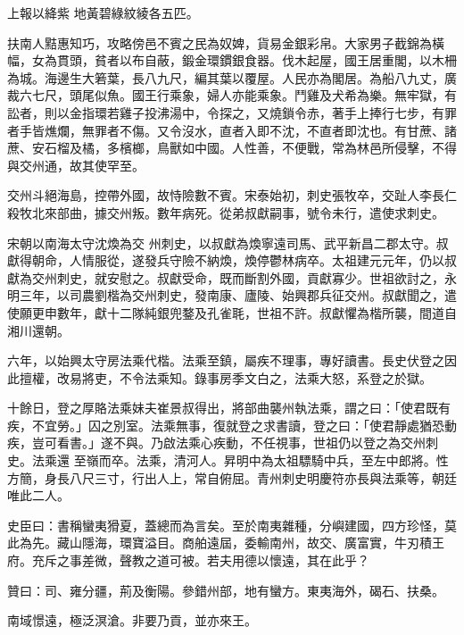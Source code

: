 \begin{pinyinscope}
 上報以絳紫
 地黃碧綠紋綾各五匹。



 扶南人黠惠知巧，攻略傍邑不賓之民為奴婢，貨易金銀彩帛。大家男子截錦為橫幅，女為貫頭，貧者以布自蔽，鍛金環鏆銀食器。伐木起屋，國王居重閣，以木柵為城。海邊生大箬葉，長八九尺，編其葉以覆屋。人民亦為閣居。為船八九丈，廣裁六七尺，頭尾似魚。國王行乘象，婦人亦能乘象。鬥雞及犬希為樂。無牢獄，有訟者，則以金指環若雞子投沸湯中，令探之，又燒鎖令赤，著手上捧行七步，有罪者手皆燋爛，無罪者不傷。又令沒水，直者入即不沈，不直者即沈也。有甘蔗、諸蔗、安石榴及橘，多檳榔，鳥獸如中國。人性善，不便戰，常為林邑所侵擊，不得與交州通，故其使罕至。



 交州斗絕海島，控帶外國，故恃險數不賓。宋泰始初，刺史張牧卒，交趾人李長仁殺牧北來部曲，據交州叛。數年病死。從弟叔獻嗣事，號令未行，遣使求刺史。



 宋朝以南海太守沈煥為交
 州刺史，以叔獻為煥寧遠司馬、武平新昌二郡太守。叔獻得朝命，人情服從，遂發兵守險不納煥，煥停鬱林病卒。太祖建元元年，仍以叔獻為交州刺史，就安慰之。叔獻受命，既而斷割外國，貢獻寡少。世祖欲討之，永明三年，以司農劉楷為交州刺史，發南康、廬陵、始興郡兵征交州。叔獻聞之，遣使願更申數年，獻十二隊純銀兜鍪及孔雀毦，世祖不許。叔獻懼為楷所襲，間道自湘川還朝。



 六年，以始興太守房法乘代楷。法乘至鎮，屬疾不理事，專好讀書。長史伏登之因此擅權，改易將吏，不令法乘知。錄事房季文白之，法乘大怒，系登之於獄。



 十餘日，登之厚賂法乘妹夫崔景叔得出，將部曲襲州執法乘，謂之曰：「使君既有疾，不宜勞。」囚之別室。法乘無事，復就登之求書讀，登之曰：「使君靜處猶恐動疾，豈可看書。」遂不與。乃啟法乘心疾動，不任視事，世祖仍以登之為交州刺史。法乘還
 至嶺而卒。法乘，清河人。昇明中為太祖驃騎中兵，至左中郎將。性方簡，身長八尺三寸，行出人上，常自俯屈。青州刺史明慶符亦長與法乘等，朝廷唯此二人。



 史臣曰：書稱蠻夷猾夏，蓋總而為言矣。至於南夷雜種，分嶼建國，四方珍怪，莫此為先。藏山隱海，環寶溢目。商舶遠屆，委輸南州，故交、廣富實，牛刃積王府。充斥之事差微，聲教之道可被。若夫用德以懷遠，其在此乎？



 贊曰：司、雍分疆，荊及衡陽。參錯州部，地有蠻方。東夷海外，碣石、扶桑。



 南域憬遠，極泛溟滄。非要乃貢，並亦來王。



\end{pinyinscope}